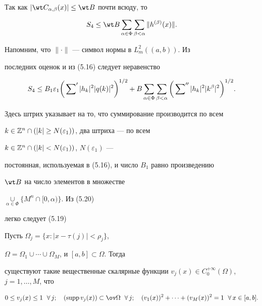 \begin{pf} 


Так как $|\wt C_{\alpha,\beta}(x)|\le\wt B$ почти всюду, то 


$$ 


S_4\le\wt B\sum_{\alpha\in\Phi}\sum_{\beta<\alpha} 


\|h^{(\beta)}(x)\|. 


$$ 


Напомним, что $\|\cdot\|$ --- символ нормы в $L^2_m((a,b))$. Из 


последних оценок и из (5.16) следует неравенство 


\begin{equation} 


S_4\le B_1\varepsilon_1\bigg(\sideset{}{'}\sum|h_k|^2 


|q(k)|^2\bigg)^{1/2}+B\sum_{\alpha\in\Phi} 


\sum_{\beta<\alpha}\bigg(\sideset{}{''}\sum|h_k|^2 


|k^\beta|^2\bigg)^{1/2}. 


\end{equation} 


Здесь штрих указывает на то, что суммирование производится по всем 


$k\in\Bbb Z^n\cap(|k|\ge N(\varepsilon_1))$, два штриха --- по всем 


$k\in\Bbb Z^n\cap(|k|<N(\varepsilon_1))$, $N(\varepsilon_1)$ --- 


постоянная, используемая в (5.16), и число $B_1$ равно произведению 


$\wt B$ на число элементов в множестве 


$\mathop{\cup}\limits_{\alpha\in\Phi}\{M^n\cap[0,\alpha)\}$. Из (5.20) 


легко следует (5.19) 


\end{pf} 


 


\begin{lems} 


Пусть $\Omega_j=\{x:|x-\tau(j)|<\rho_j\}$, 


$\Omega=\Omega_1\cup\dotsb\cup\Omega_M$, и $[a,b]\subset\Omega$. Тогда 


существуют такие вещественные скалярные функции $v_j(x)\in 


C^{+\infty}_0(\Omega)$, $j=1,\dotsc,M$, что 


\begin{equation} 


0\le v_j(x)\le 1\ \; \forall\,j;\quad 


(\supp v_j(x))\subset\ov\Omega\ \; \forall\,j;\quad 


(v_1(x))^2+\dotsb+(v_M(x))^2=1\ \; \forall\,x\in[a,b]. 


\end{equation} 


\end{lems} 



